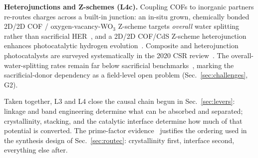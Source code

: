\textbf{Heterojunctions and Z-schemes (L4c).} Coupling COFs to inorganic partners re-routes
charges across a built-in junction: an in-situ grown, chemically bonded 2D/2D COF /
oxygen-vacancy-WO$_3$ Z-scheme targets \emph{overall} water splitting rather than sacrificial
HER~\cite{shen2023in}, and a 2D/2D COF/CdS Z-scheme heterojunction enhances photocatalytic
hydrogen evolution~\cite{gao20222d}. Composite and heterojunction photocatalysts are surveyed
systematically in the 2020 CSR review~\cite{wang2020covalent}. The overall-water-splitting
rates remain far below sacrificial benchmarks~\cite{shen2023in}, marking the sacrificial-donor
dependency as a field-level open problem (Sec.~\ref{sec:challenges}, G2).

Taken together, L3 and L4 close the causal chain begun in Sec.~\ref{sec:levers}: linkage and
band engineering determine what can be absorbed and separated; crystallinity, stacking, and the
catalytic interface determine how much of that potential is converted. The prime-factor
evidence~\cite{ghosh2020identification} justifies the ordering used in the synthesis design of
Sec.~\ref{sec:routec}: crystallinity first, interface second, everything else after.
